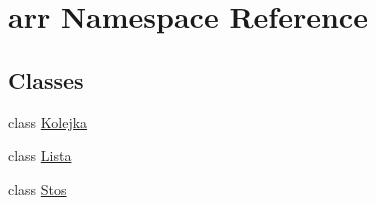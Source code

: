 \hypertarget{namespacearr}{\section{arr Namespace Reference}
\label{namespacearr}
}
\subsection*{Classes}
\begin{DoxyCompactItemize}
\item 
class \hyperlink{classarr_1_1_kolejka}{Kolejka}
\item 
class \hyperlink{classarr_1_1_lista}{Lista}
\item 
class \hyperlink{classarr_1_1_stos}{Stos}
\end{DoxyCompactItemize}
